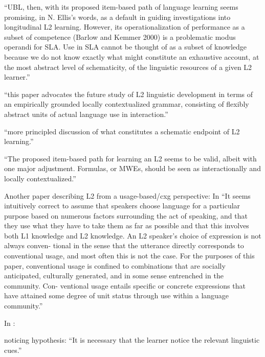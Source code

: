 ``UBL, then, with its proposed item-based path of language learning seems
promising, in N. Ellis’s words, as a default in guiding investigations into
longitudinal L2 learning. However, its operationalization of performance as a
subset of competence (Barlow and Kemmer 2000) is a problematic modus
operandi for SLA. Use in SLA cannot be thought of as a subset of knowledge
because we do not know exactly what might constitute an exhaustive
account, at the most abstract level of schematicity, of the linguistic resources
of a given L2 learner.''

``this paper advocates the future study of L2 linguistic
development in terms of an empirically grounded locally contextualized
grammar, consisting of flexibly abstract units of actual language use in
interaction.''

``more principled discussion of what constitutes a schematic endpoint of L2 learning.''

``The proposed item-based path for learning an L2 seems to be valid, albeit
with one major adjustment. Formulas, or MWEs, should be seen as
interactionally and locally contextualized.''

Another paper describing L2 from a usage-based/cxg perspective:
In \cite{Waara04}
``It seems intuitively correct to assume
that speakers choose language for a particular purpose based on numerous
factors surrounding the act of speaking, and that they use what they have to
take them as far as possible and that this involves both L1 knowledge and
L2 knowledge. An L2 speaker's choice of expression is not always conven-
tional in the sense that the utterance directly corresponds to conventional
usage, and most often this is not the case. For the purposes of this paper,
conventional usage is confined to combinations that are socially anticipated,
culturally generated, and in some sense entrenched in the community. Con-
ventional usage entails specific or concrete expressions that have attained
some degree of unit status through use within a language community.''


        In \cite{Ellis04}:

        noticing hypothesis: ``It is necessary that the learner notice the relevant linguistic cues.''

